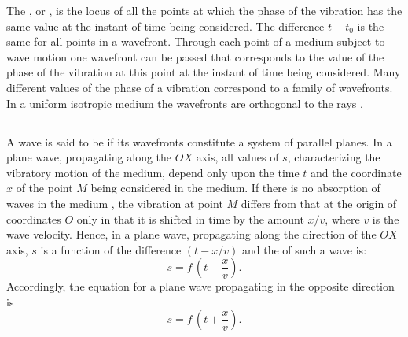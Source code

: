 The , or , is the locus of all the points at which the phase of the vibration has the same value at the instant of time being considered. The difference $t - t_{0}$ is the same for all points in a wavefront. Through each point of a medium subject to wave motion one wavefront can be passed that corresponds to the value of the phase of the vibration at this point at the instant of time being considered. Many different values of the phase of a vibration correspond to a family of wavefronts. In a uniform isotropic medium  the wavefronts are orthogonal to the rays .

\subsection{}\label{30.2.4} A wave is said to be  if its wavefronts constitute a system of parallel planes. In a plane wave, propagating along the $OX$ axis, all values of $s$, characterizing the vibratory motion of the medium, depend only upon the time $t$ and the coordinate $x$ of the point $M$ being considered in the medium. If there is no absorption of waves in the medium , the vibration at point $M$ differs from that at the origin of coordinates $O$ only in that it is shifted in time by the amount $x/v$, where $v$ is the wave velocity. Hence, in a plane wave, propagating along the  direction of the $OX$ axis, $s$ is a function of the difference $(t - x/v)$ and the  of such a  wave is:
\begin{equation*}%
s = f \, \left( t - \frac{x}{v} \right).
\end{equation*}
Accordingly, the equation for a plane wave propagating in the opposite direction is
\begin{equation*}%
s = f \, \left( t + \frac{x}{v} \right).
\end{equation*}

